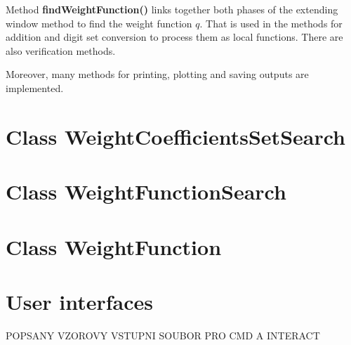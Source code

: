 Method \textbf{findWeightFunction()} links together both phases of the extending window method to find the weight function $q$. That is used in the methods for addition and digit set conversion to process them as local functions. There are also verification methods.

Moreover, many methods for printing, plotting and saving outputs are implemented.




\section{Class WeightCoefficientsSetSearch}



\section{Class WeightFunctionSearch}



\section{Class WeightFunction}


\section{User interfaces}

POPSANY VZOROVY VSTUPNI SOUBOR PRO CMD A INTERACT
